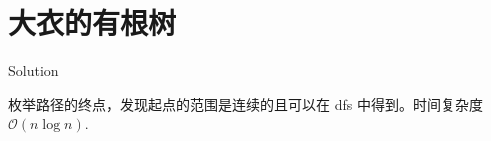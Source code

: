 \section{大衣的有根树}

\begin{frame}{Solution}

枚举路径的终点，发现起点的范围是连续的且可以在 dfs 中得到。时间复杂度 $\mathcal O(n\log n)$.

\end{frame}
